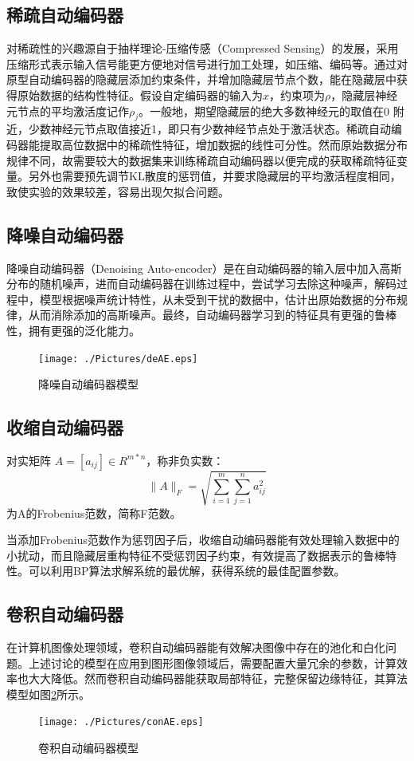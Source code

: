 \documentclass[oneside]{ZJUthesis}
\begin{document}
\subsection{稀疏自动编码器}
对稀疏性的兴趣源自于抽样理论-压缩传感（Compressed Sensing）的发展，采用压缩形式表示输入信号能更方便地对信号进行加工处理，如压缩、编码等。通过对原型自动编码器的隐藏层添加约束条件，并增加隐藏层节点个数，能在隐藏层中获得原始数据的结构性特征。假设自定编码器的输入为$x$，约束项为$\rho$，隐藏层神经元节点的平均激活度记作$\rho_j$。一般地，期望隐藏层的绝大多数神经元的取值在0 附近，少数神经元节点取值接近1，即只有少数神经节点处于激活状态。稀疏自动编码器能提取高位数据中的稀疏性特征，增加数据的线性可分性。然而原始数据分布规律不同，故需要较大的数据集来训练稀疏自动编码器以便完成的获取稀疏特征变量。另外也需要预先调节KL散度的惩罚值，并要求隐藏层的平均激活程度相同，致使实验的效果较差，容易出现欠拟合问题。

\subsection{降噪自动编码器}
降噪自动编码器（Denoising Auto-encoder）是在自动编码器的输入层中加入高斯分布的随机噪声，进而自动编码器在训练过程中，尝试学习去除这种噪声，解码过程中，模型根据噪声统计特性，从未受到干扰的数据中，估计出原始数据的分布规律，从而消除添加的高斯噪声。最终，自动编码器学习到的特征具有更强的鲁棒性，拥有更强的泛化能力\cite{28}。
\begin{figure}[h]
\centering
\texttt{[image: ./Pictures/deAE.eps]}
\caption{降噪自动编码器模型\label{fig:tanh}}
\end{figure}

\subsection{收缩自动编码器}
\begin{defn}[Frobenius范数]
	对实矩阵 $A=[a_{ij}] \in R^{m*n}$，称非负实数：
	\begin{equation}
	\|A\|_F=\sqrt{\sum\limits_{i=1}^{m}\sum\limits_{j=1}^{n}{a_{ij}^2}}
	\end{equation}
	为A的Frobenius范数，简称F范数。
\end{defn}
当添加Frobenius范数作为惩罚因子后，收缩自动编码器能有效处理输入数据中的小扰动，而且隐藏层重构特征不受惩罚因子约束，有效提高了数据表示的鲁棒特性。可以利用BP算法求解系统的最优解，获得系统的最佳配置参数\cite{32}。

\subsection{卷积自动编码器}
在计算机图像处理领域，卷积自动编码器能有效解决图像中存在的池化和白化问题。上述讨论的模型在应用到图形图像领域后，需要配置大量冗余的参数，计算效率也大大降低。然而卷积自动编码器能获取局部特征，完整保留边缘特征，其算法模型如图\ref{fig:conv}所示。
\begin{figure}[h]
\centering
\texttt{[image: ./Pictures/conAE.eps]}
\caption{卷积自动编码器模型\label{fig:conv}}
\end{figure}
\end{document}

